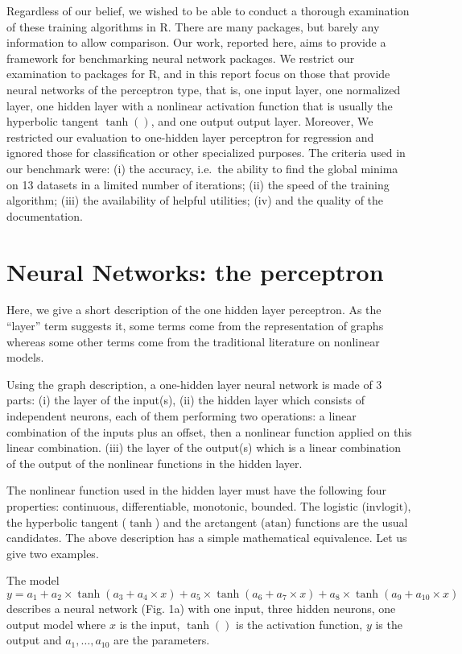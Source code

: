 Regardless of our belief, we wished to be able to conduct a thorough
examination of these training algorithms in R. There are many packages,
but barely any information to allow comparison. Our work, reported here,
aims to provide a framework for benchmarking neural network packages. We
restrict our examination to packages for R, and in this report focus on
those that provide neural networks of the perceptron type, that is, one
input layer, one normalized layer, one hidden layer with a nonlinear
activation function that is usually the hyperbolic tangent \(\tanh()\),
and one output output layer. Moreover, We restricted our evaluation to
one-hidden layer perceptron for regression and ignored those for
classification or other specialized purposes. The criteria used in our
benchmark were: (i) the accuracy, i.e.~the ability to find the global
minima on 13 datasets in a limited number of iterations; (ii) the speed
of the training algorithm; (iii) the availability of helpful utilities;
(iv) and the quality of the documentation.

\hypertarget{neural-networks-the-perceptron}{%
\section{Neural Networks: the
perceptron}\label{neural-networks-the-perceptron}}

Here, we give a short description of the one hidden layer perceptron. As
the ``layer'' term suggests it, some terms come from the representation
of graphs whereas some other terms come from the traditional literature
on nonlinear models.

Using the graph description, a one-hidden layer neural network is made
of 3 parts: (i) the layer of the input(s), (ii) the hidden layer which
consists of independent neurons, each of them performing two operations:
a linear combination of the inputs plus an offset, then a nonlinear
function applied on this linear combination. (iii) the layer of the
output(s) which is a linear combination of the output of the nonlinear
functions in the hidden layer.

The nonlinear function used in the hidden layer must have the following
four properties: continuous, differentiable, monotonic, bounded. The
logistic (\(\text{invlogit}\)), the hyperbolic tangent (\(\tanh\)) and
the arctangent (\(\text{atan}\)) functions are the usual candidates. The
above description has a simple mathematical equivalence. Let us give two
examples.

The model
\(y = a_1 + a_2\times \tanh(a_3 + a_4\times x) + a_5\times \tanh(a_6 + a_7\times x) + a_8\times \tanh(a_9 + a_{10}\times x)\)
describes a neural network (Fig. 1a) with one input, three hidden
neurons, one output model where \(x\) is the input, \(\tanh()\) is the
activation function, \(y\) is the output and \(a_1,\dots,a_{10}\) are
the parameters.

